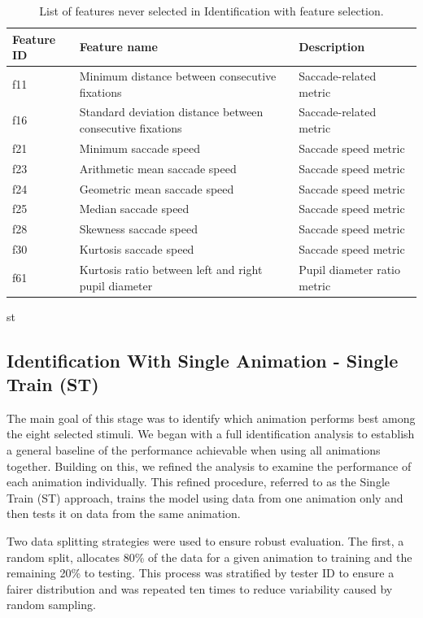 \documentclass[12pt]{report}
\begin{document}
\begin{table}[H]
\centering
\small
\setlength{\tabcolsep}{4pt} %
\caption{List of features never selected in Identification with feature selection.}
\label{tab:ns_id}
\begin{tabular}{lll}
\toprule
\textbf{Feature ID} & \textbf{Feature name} & \textbf{Description} \\
\midrule
f11 & Minimum distance between consecutive fixations & Saccade-related metric \\
f16 & Standard deviation distance between consecutive fixations & Saccade-related metric \\
f21 & Minimum saccade speed & Saccade speed metric \\
f23 & Arithmetic mean saccade speed & Saccade speed metric \\
f24 & Geometric mean saccade speed & Saccade speed metric \\
f25 & Median saccade speed & Saccade speed metric \\
f28 & Skewness saccade speed & Saccade speed metric \\
f30 & Kurtosis saccade speed & Saccade speed metric \\
f61 & Kurtosis ratio between left and right pupil diameter & Pupil diameter ratio metric \\
\bottomrule
\end{tabular}st
\end{table}
\FloatBarrier


\subsection{Identification With Single Animation - Single Train (ST)}
\label{subsec:id_s_st}

The main goal of this stage was to identify which animation performs best among the eight selected stimuli. 
We began with a full identification analysis to establish a general baseline of the performance achievable when using all animations together. 
Building on this, we refined the analysis to examine the performance of each animation individually. 
This refined procedure, referred to as the Single Train (ST) approach, trains the model using data from one animation only and then tests it on data from the same animation.

Two data splitting strategies were used to ensure robust evaluation. 
The first, a random split, allocates 80\% of the data for a given animation to training and the remaining 20\% to testing.
This process was stratified by tester ID to ensure a fairer distribution and was repeated ten times to reduce variability caused by random sampling.
\end{document}
